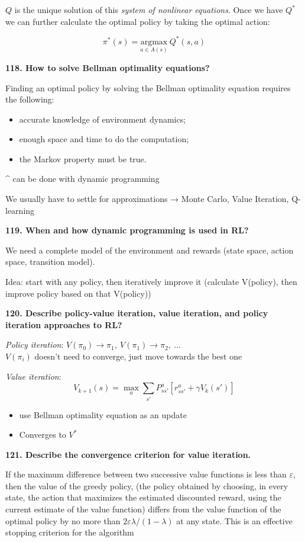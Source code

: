 $Q$ is the unique solution of this \textit{system of nonlinear equations}.
Once we have $Q^*$ we can further calculate the optimal policy by taking
the optimal action:

\[ \pi^*(s) = \underset{a \in A(s)}{\text{argmax}}\ Q^*(s,a)\]

\textbf{118. How to solve Bellman optimality equations?}

Finding an optimal policy by solving the Bellman optimality equation
requires the following:

\begin{itemize}
\item accurate knowledge of environment dynamics;
\item enough space and time to do the computation;
\item the Markov property must be true.
\end{itemize}

\^{} can be done with dynamic programming

We usually have to settle for approximations → Monte Carlo, Value
Iteration, Q-learning

\textbf{119. When and how dynamic programming is used in RL?}

We need a complete model of the environment and rewards (state space,
action space, transition model).

Idea: start with any policy, then iteratively improve it (calculate
V(policy), then improve policy based on that V(policy))

\textbf{120. Describe policy-value iteration, value iteration, and
policy iteration approaches to RL?}

\textit{Policy iteration}: $V(\pi_0) \to \pi_1,\ V(\pi_1) \to \pi_2,\ \dots$ \\
$V(\pi_i)$ doesn't need to converge, just move towards the best one

\textit{Value iteration}:
\[ V_{k+1} (s) = \max_a \sum_{s'} P_{ss'}^a \left[ r_{ss'}^a + \gamma V_k(s') \right]\]

\begin{itemize}
\item use Bellman optimality equation as an update
\item Converges to $V^*$
\end{itemize}

\textbf{121. Describe the convergence criterion for value iteration.}

If the maximum difference between two successive value functions is less
than $\varepsilon$, then the value of the greedy policy, (the policy obtained by
choosing, in every state, the action that maximizes the estimated
discounted reward, using the current estimate of the value function)
differs from the value function of the optimal policy by no more than 
$2\varepsilon \lambda/(1-\lambda )$ at any state. This is an effective stopping 
criterion for the algorithm

